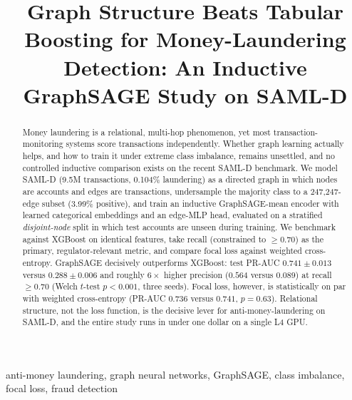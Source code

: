 \documentclass[conference]{IEEEtran}
\begin{document}
\title{Graph Structure Beats Tabular Boosting for Money-Laundering Detection: An Inductive GraphSAGE Study on SAML-D}

\author{
}

\maketitle

\begin{abstract}
Money laundering is a relational, multi-hop phenomenon, yet most transaction-monitoring systems score
transactions independently. Whether graph learning actually helps, and how to train it under extreme class
imbalance, remains unsettled, and no controlled inductive comparison exists on the recent SAML-D benchmark.
We model SAML-D (9.5M transactions, 0.104\% laundering) as a directed graph in which nodes are accounts and
edges are transactions, undersample the majority class to a 247{,}247-edge subset (3.99\% positive), and
train an inductive GraphSAGE-mean encoder with learned categorical embeddings and an edge-MLP head,
evaluated on a stratified \emph{disjoint-node} split in which test accounts are unseen during training. We
benchmark against XGBoost on identical features, take recall (constrained to $\geq 0.70$) as the primary,
regulator-relevant metric, and compare focal loss against weighted cross-entropy. GraphSAGE decisively
outperforms XGBoost: test PR-AUC $0.741 \pm 0.013$ versus $0.288 \pm 0.006$ and roughly $6\times$ higher
precision ($0.564$ versus $0.089$) at recall $\geq 0.70$ (Welch $t$-test $p < 0.001$, three seeds). Focal
loss, however, is statistically on par with weighted cross-entropy (PR-AUC $0.736$ versus $0.741$,
$p = 0.63$). Relational structure, not the loss function, is the decisive lever for anti-money-laundering
on SAML-D, and the entire study runs in under one dollar on a single L4 GPU.
\end{abstract}

\begin{IEEEkeywords}
anti-money laundering, graph neural networks, GraphSAGE, class imbalance, focal loss, fraud detection
\end{IEEEkeywords}
\end{document}
